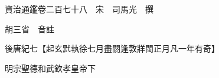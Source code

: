 










 


 
 


 

  
  
  
  
  





  
  
  
  
  
 
  

  

  
  
  



  

 
 

  
   




  

  
  


  　　資治通鑑卷二百七十八　宋　司馬光　撰

　　胡三省　音註

　　後唐紀七【起玄黓執徐七月盡閼逢敦牂閩正月凡一年有奇】

　　明宗聖德和武欽孝皇帝下


